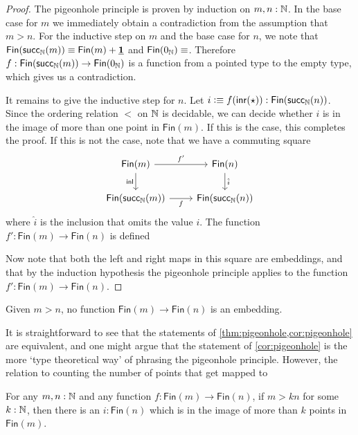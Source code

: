 \begin{proof}
  The pigeonhole principle is proven by induction on $m,n:{\mathbb{N}}$. In the base case for $m$ we immediately obtain a contradiction from the assumption that $m>n$. For the inductive step on $m$ and the base case for $n$, we note that $\mathsf{Fin}(\mathsf{succ}_{{\mathbb{N}}}(m))\equiv \mathsf{Fin}(m)+\underline{\mathbf{1}}$ and $\mathsf{Fin}(\zeroN)\jdeq \empty$. Therefore $f:\mathsf{Fin}(\mathsf{succ}_{{\mathbb{N}}}(m))\to\mathsf{Fin}(0_{{\mathbb{N}}})$ is a function from a pointed type to the empty type, which gives us a contradiction.

  It remains to give the inductive step for $n$. Let $i\vcentcolon\equiv f({\mathsf{inr}}(\star)):\mathsf{Fin}(\mathsf{succ}_{{\mathbb{N}}}(n))$. Since the ordering relation $<$ on ${\mathbb{N}}$ is decidable, we can decide whether $i$ is in the image of more than one point in $\mathsf{Fin}(m)$. If this is the case, this completes the proof. If this is not the case, note that we have a commuting square
  \begin{equation*}
    \begin{tikzcd}
      \mathsf{Fin}(m) \arrow[r,"{f'}"] \arrow[d,swap,"\inl"] & \mathsf{Fin}(n) \arrow[d,"{\hat{i}}"] \\
      \mathsf{Fin}(\succN(m)) \arrow[r,swap,"f"] & \mathsf{Fin}(\succN(n))
    \end{tikzcd}
  \end{equation*}
  where $\hat{i}$ is the inclusion that omits the value $i$. The function $f':\mathsf{Fin}(m)\to\mathsf{Fin}(n)$ is defined 

  Now note that both the left and right maps in this square are embeddings, and that by the induction hypothesis the pigeonhole principle applies to the function $f':\mathsf{Fin}(m)\to\mathsf{Fin}(n)$. 
\end{proof}

\begin{cor}\label{cor:pigeonhole}
  Given $m>n$, no function $\mathsf{Fin}(m)\to\mathsf{Fin}(n)$ is an embedding.
\end{cor}

It is straightforward to see that the statements of \cref{thm:pigeonhole,cor:pigeonhole} are equivalent, and one might argue that the statement of \cref{cor:pigeonhole} is the more `type theoretical way' of phrasing the pigeonhole principle. However, the relation to counting the number of points that get mapped to 

\begin{thm}\label{thm:generalized-pigeonhole}
  For any $m,n:{\mathbb{N}}$ and any function $f:\mathsf{Fin}(m)\to\mathsf{Fin}(n)$, if $m>kn$ for some $k:{\mathbb{N}}$, then there is an $i:\mathsf{Fin}(n)$ which is in the image of more than $k$ points in $\mathsf{Fin}(m)$. 
\end{thm}

